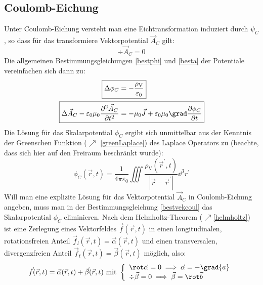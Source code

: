 \subsection{Coulomb-Eichung}\label{couleich}
Unter Coulomb-Eichung versteht man eine Eichtransformation induziert durch $\psi_{{C}}$, so dass für das transformiere Vektorpotential $\vec{{A}}_{{C}}$ gilt:
\begin{equation}\label{coulbdg}
	\boxed{\div \vec{A}_{C}=0 }
\end{equation}
Die allgemeinen Bestimmungsgleichungen \ref{bestphi} und \ref{besta} der Potentiale vereinfachen sich dann zu:
\begin{align}\label{bestskalcoul}
	\Aboxed{\Delta \phi_{{C}}&=-\frac{\rho_\text{V}}{\varepsilon_{0}}} \\
	 \Aboxed{\Delta \vec{{A}}_{{C}}-\varepsilon_{0} \mu_{0} \frac{\partial^{2} \vec{{A}}_{{C}}}{\partial {t}^{2}}&=-\mu_{0} \vec{{J}}+\varepsilon_{0} \mu_{0} \grad \frac{\partial \phi_{{C}}}{\partial {t}}}\label{bestvekcoul}
\end{align}
Die Lösung für das Skalarpotential $\phi_{{C}}$ ergibt sich unmittelbar aus der Kenntnis der Greenschen Funktion ($\nearrow$ \ref{greenLaplace}) des Laplace Operators zu (beachte, dass sich hier auf den Freiraum beschränkt wurde):
\begin{equation}\label{skalarpotcoul}
	\boxed{\phi_{{C}}(\vec{{r}}, {t})=\frac{1}{4 \pi \varepsilon_{0}} \iiint \frac{\rho_\text{V}\left(\vec{{r}}^{\prime}, {t}\right)}{\left|\vec{{r}}-\vec{{r}}^{\prime}\right|} \dd^3 {r}^{\prime}} 
\end{equation}
 Will man eine explizite Lösung für das Vektorpotential $\vec{A}_{C}$ in Coulomb-Eichung angeben, muss man in der Bestimmungsgleichung \ref{bestvekcoul} das Skalarpotential $\phi_{{C}}$ eliminieren.  Nach dem Helmholtz-Theorem ($\nearrow$\ref{helmholtz}) ist eine Zerlegung eines Vektorfeldes $\vec{f}(\vec{r}, t)$ in einen longitudinalen, rotationsfreien Anteil $\vec{f}_{l}(\vec{r}, t)=\vec{\alpha}(\vec{r}, t)$ und einen transversalen, divergenzfreien Anteil $\vec{{f}}_{{t}}(\vec{{r}}, {t})=\vec{\beta}(\vec{{r}}, {t})$ möglich, also:
\begin{equation}\label{coulzerl1}
\vec{{f}}(\vec{{r}}, {t})=\vec{\alpha}(\vec{{r}}, {t})+\vec{\beta}(\vec{{r}}, {t}) \text { mit }\left\{\begin{array}{l}
	\rot \vec{\alpha}=0 \implies \vec{\alpha}=-\grad {a}  \\
	\div \vec{\beta}=0 \implies \vec{\beta}=\rot \vec{{b}}
\end{array}\right.
\end{equation}
